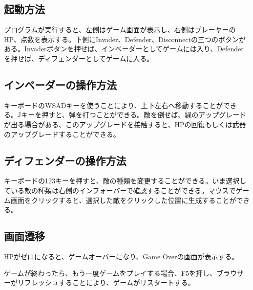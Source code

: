 \subsection{起動方法}
	プログラムが実行すると、左側はゲーム画面が表示し、右側はプレーヤーのHP、点数を表示する。下側にInvader、Defender、Disconnectの三つのボタンがある。Invaderボタンを押せば、インベーダーとしてゲームには入り、Defenderを押せば、ディフェンダーとしてゲームに入る。
\subsection{インベーダーの操作方法}
	キーボードのWSADキーを使うことにより、上下左右へ移動することができる。Jキーを押すと、弾を打つことができる。敵を倒せば、緑のアップグレードが出る場合がある、このアップグレードを接触すると、HPの回復もしくは武器のアップグレードすることができる。
\subsection{ディフェンダーの操作方法}
	キーボードの123キーを押すと、敵の種類を変更することができる。いま選択している敵の種類は右側のインフォーバーで確認することができる。マウスでゲーム画面をクリックすると、選択した敵をクリックした位置に生成することができる。
\subsection{画面遷移}
	HPがゼロになると、ゲームオーバーになり、Game Overの画面が表示する。
	
	ゲームが終わったら、もう一度ゲームをプレイする場合、F5を押し、ブラウザーがリフレッシュすることにより、ゲームがリスタートする。